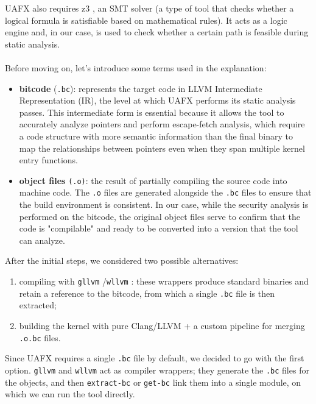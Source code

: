 UAFX also requires z3 \cite{bib:z3}, an SMT solver \cite{bib:smt} (a type of tool that checks whether a logical formula is satisfiable based on mathematical rules). It acts as a logic engine and, in our case, is used to check whether a certain path is feasible during static analysis.
\\\\
Before moving on, let's introduce some terms used in the explanation:
\begin{itemize}
    \item \textbf{bitcode} (\texttt{.bc}): represents the target code in LLVM Intermediate Representation (IR), the level at which UAFX performs its static analysis passes. This intermediate form is essential because it allows the tool to accurately analyze pointers and perform escape-fetch analysis, which require a code structure with more semantic information than the final binary to map the relationships between pointers even when they span multiple kernel entry functions.

    \item \textbf{object files} \texttt{(.o)}: the result of partially compiling the source code into machine code. The \texttt{.o} files are generated alongside the \texttt{.bc} files to ensure that the build environment is consistent. In our case, while the security analysis is performed on the bitcode, the original object files serve to confirm that the code is "compilable" and ready to be converted into a version that the tool can analyze.
\end{itemize}

\noindent After the initial steps, we considered two possible alternatives:
\begin{enumerate}
    \item compiling with \texttt{gllvm} \cite{bib:gllvm}/\texttt{wllvm} \cite{bib:wllvm}: these wrappers produce standard binaries and retain a reference to the bitcode, from which a single \texttt{.bc} file is then extracted;

    \item building the kernel with pure Clang/LLVM + a custom pipeline for merging \texttt{.o.bc} files.
\end{enumerate}

\noindent Since UAFX requires a single \texttt{.bc} file by default, we decided to go with the first option. \texttt{gllvm} and \texttt{wllvm} act as compiler wrappers; they generate the \texttt{.bc} files for the objects, and then \texttt{extract-bc} or \texttt{get-bc} link them into a single module, on which we can run the tool directly.

